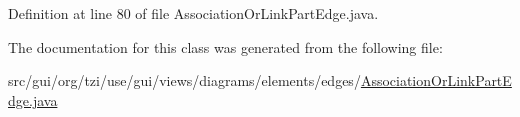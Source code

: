 Definition at line 80 of file Association\-Or\-Link\-Part\-Edge.\-java.



The documentation for this class was generated from the following file\-:\begin{DoxyCompactItemize}
\item 
src/gui/org/tzi/use/gui/views/diagrams/elements/edges/\hyperlink{_association_or_link_part_edge_8java}{Association\-Or\-Link\-Part\-Edge.\-java}\end{DoxyCompactItemize}
